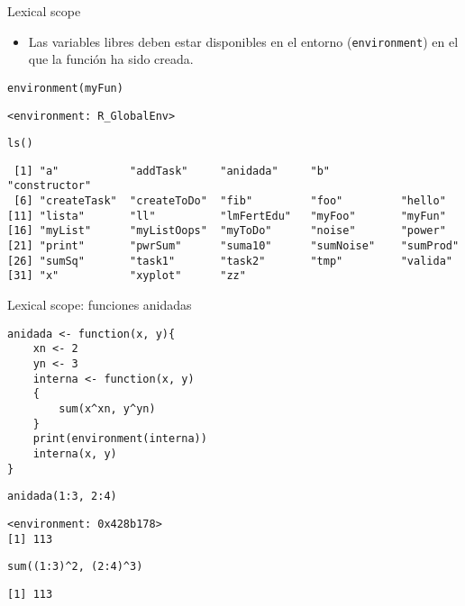 \documentclass[xcolor={usenames,svgnames,dvipsnames}]{beamer}
\begin{document}
\begin{frame}[fragile,label={sec:orgheadline14}]{Lexical scope}
 \begin{itemize}
\item Las variables libres deben estar disponibles en el entorno
(\texttt{environment}) en el que la función ha sido creada.
\end{itemize}
\lstset{language=R,label= ,caption= ,captionpos=b,numbers=none}
\begin{lstlisting}
environment(myFun)
\end{lstlisting}

\begin{verbatim}
<environment: R_GlobalEnv>
\end{verbatim}

\lstset{language=R,label= ,caption= ,captionpos=b,numbers=none}
\begin{lstlisting}
ls()
\end{lstlisting}

\begin{verbatim}
 [1] "a"           "addTask"     "anidada"     "b"           "constructor"
 [6] "createTask"  "createToDo"  "fib"         "foo"         "hello"      
[11] "lista"       "ll"          "lmFertEdu"   "myFoo"       "myFun"      
[16] "myList"      "myListOops"  "myToDo"      "noise"       "power"      
[21] "print"       "pwrSum"      "suma10"      "sumNoise"    "sumProd"    
[26] "sumSq"       "task1"       "task2"       "tmp"         "valida"     
[31] "x"           "xyplot"      "zz"
\end{verbatim}
\end{frame}

\begin{frame}[fragile,label={sec:orgheadline15}]{Lexical scope: funciones anidadas}
 \lstset{language=R,label= ,caption= ,captionpos=b,numbers=none}
\begin{lstlisting}
anidada <- function(x, y){
    xn <- 2
    yn <- 3
    interna <- function(x, y)
    {
        sum(x^xn, y^yn)
    }
    print(environment(interna))
    interna(x, y)
}
\end{lstlisting}

\lstset{language=R,label= ,caption= ,captionpos=b,numbers=none}
\begin{lstlisting}
anidada(1:3, 2:4)
\end{lstlisting}

\begin{verbatim}
<environment: 0x428b178>
[1] 113
\end{verbatim}

\lstset{language=R,label= ,caption= ,captionpos=b,numbers=none}
\begin{lstlisting}
sum((1:3)^2, (2:4)^3)
\end{lstlisting}

\begin{verbatim}
[1] 113
\end{verbatim}
\end{frame}
\end{document}

